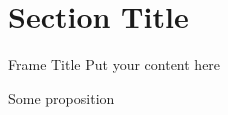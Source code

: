 \section{Section Title}

\begin{frame}{Frame Title}
	Put your content here

\end{frame}

\begin{frame}{}
	\begin{proposition}
		Some proposition
	\end{proposition}

\end{frame}

